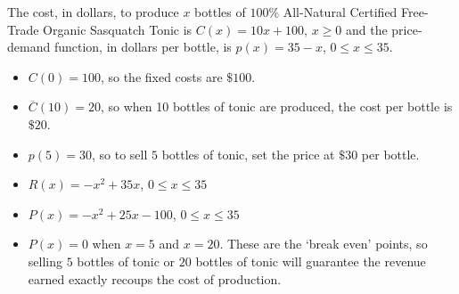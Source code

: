 {The cost, in dollars, to produce $x$ bottles of $100 \%$ All-Natural Certified Free-Trade Organic Sasquatch Tonic is $C(x) = 10x+100$, $x \geq 0$ and the price-demand function, in dollars per bottle,  is $p(x) = 35 - x$, $0 \leq x \leq 35$. }
{ \begin{itemize}

\item  $C(0) = 100$, so the fixed costs are $\$100$.

\item  $\overline{C}(10) = 20$, so when 10 bottles of tonic are produced, the cost per bottle is $\$20$.

\item  $p(5) = 30$, so to sell $5$ bottles of tonic, set the price at $\$30$ per bottle.

\item $R(x) = -x^2+35x$, $0 \leq x \leq 35$

\item  $P(x) = -x^2+25x-100$, $0 \leq x \leq 35$

\item  $P(x) = 0$ when $x = 5$ and $x=20$.  These are the `break even' points, so selling $5$ bottles of tonic or $20$ bottles of tonic will guarantee the revenue earned exactly recoups the cost of production.

\end{itemize}
}